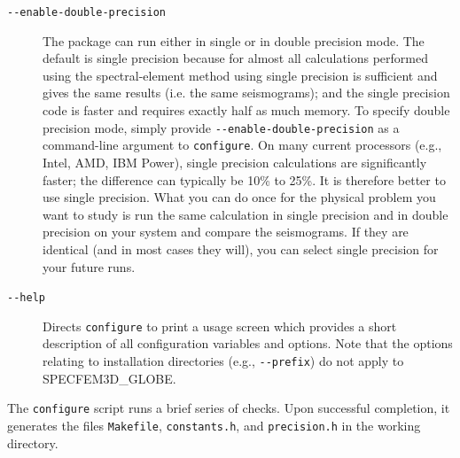 \documentclass[oneside,english]{book}
\begin{document}
\begin{description}
\item [{\texttt{-{}-enable-double-precision}}] The package can run either
in single or in double precision mode. The default is single precision
because for almost all calculations performed using the spectral-element method
using single precision is sufficient and gives the same results (i.e. the same seismograms);
and the single precision code is faster and requires exactly half as much memory. To specify
double precision mode, simply provide \texttt{-{}-enable-double-precision}
as a command-line argument to \texttt{configure}.
On many current processors (e.g., Intel, AMD, IBM Power), single precision calculations
are significantly faster; the difference can typically be 10\%
to 25\%. It is therefore better to use single precision.
What you can do once for the physical problem you want to study is run the same calculation in single precision
and in double precision on your system and compare the seismograms.
If they are identical (and in most cases they will), you can select single precision for your future runs.
\item [{\texttt{-{}-help}}] Directs \texttt{configure} to print a usage
screen which provides a short description of all configuration variables
and options. Note that the options relating to installation directories
(e.g., \texttt{-{}-prefix}) do not apply to SPECFEM3D\_GLOBE.
\end{description}
The \texttt{configure} script runs a brief series of checks. Upon
successful completion, it generates the files \texttt{Makefile}, \texttt{constants.h},
and \texttt{precision.h} in the working directory.
\end{document}
